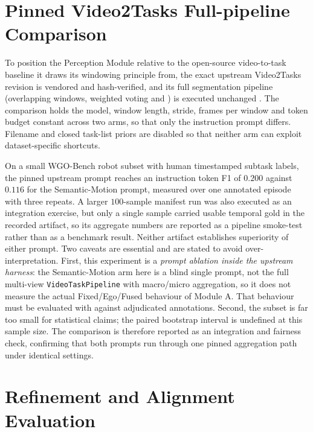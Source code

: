 \documentclass[11pt,oneside]{report}
\begin{document}
\section{Pinned Video2Tasks Full-pipeline Comparison}
To position the Perception Module relative to the open-source video-to-task
baseline it draws its windowing principle from, the exact upstream Video2Tasks
revision is vendored and hash-verified, and its full segmentation pipeline
(overlapping windows, weighted voting and ) is
executed unchanged \cite{video2tasks2025}. The comparison holds the model,
window length, stride, frames per window and token budget constant across two
arms, so that only the instruction prompt differs. Filename and closed
task-list priors are disabled so that neither arm can exploit dataset-specific
shortcuts.

On a small WGO-Bench robot subset with human timestamped subtask labels, the
pinned upstream prompt reaches an instruction token F1 of $0.200$ against
$0.116$ for the Semantic-Motion prompt, measured over one annotated episode with
three repeats. A larger $100$-sample manifest run was also executed as an
integration exercise, but only a single sample carried usable temporal gold in
the recorded artifact, so its aggregate numbers are reported as a pipeline
smoke-test rather than as a benchmark result. Neither artifact establishes
superiority of either prompt. Two caveats are essential and are stated to avoid
over-interpretation. First, this experiment is a \emph{prompt ablation inside the
upstream harness}: the Semantic-Motion arm here is a blind single prompt, not the
full multi-view \texttt{VideoTaskPipeline} with macro/micro aggregation, so it
does not measure the actual Fixed/Ego/Fused behaviour of Module A. That behaviour
must be evaluated with  against
adjudicated annotations. Second, the subset is far too small for statistical
claims; the paired bootstrap interval is undefined at this sample size. The
comparison is therefore reported as an integration and fairness check, confirming
that both prompts run through one pinned aggregation path under identical
settings.

\section{Refinement and Alignment Evaluation}
\end{document}
